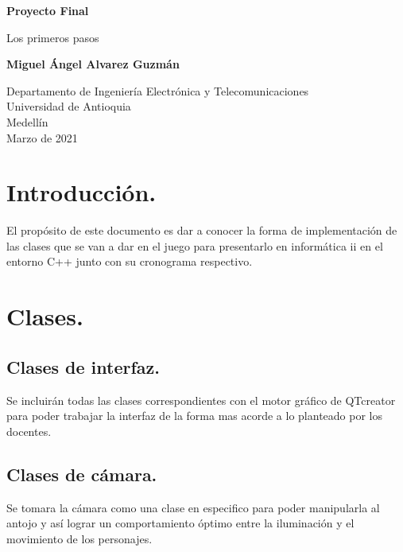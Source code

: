\documentclass{article}
\begin{document}
\begin{titlepage}
    \begin{center}
        \vspace*{1cm}
            
        \Huge
        \textbf{Proyecto Final}
            
        \vspace{0.5cm}
        \LARGE
        Los primeros pasos
            
        \vspace{1.5cm}
            
        \textbf{Miguel Ángel Alvarez Guzmán}
            
        \vfill
            
        \vspace{0.8cm}
            
        \Large
        Departamento de Ingeniería Electrónica y Telecomunicaciones\\
        Universidad de Antioquia\\
        Medellín\\
        Marzo de 2021
            
    \end{center}
\end{titlepage}

\tableofcontents
\newpage
\section{Introducción.}\label{intro}
El propósito de este documento es dar a conocer la forma de implementación de las clases que se van a dar en el juego para presentarlo en informática ii en el entorno C++ junto con su cronograma respectivo.
\section{Clases.} \label{contenido}
\subsection{Clases de interfaz.}
Se incluirán todas las clases correspondientes con el motor gráfico de QTcreator para poder trabajar la interfaz de la forma mas acorde a lo planteado por los docentes.
\subsection{Clases de cámara.}
Se tomara la cámara como una clase en especifico para poder manipularla al antojo y así lograr un comportamiento óptimo entre la iluminación y el movimiento de los personajes.
\end{document}
